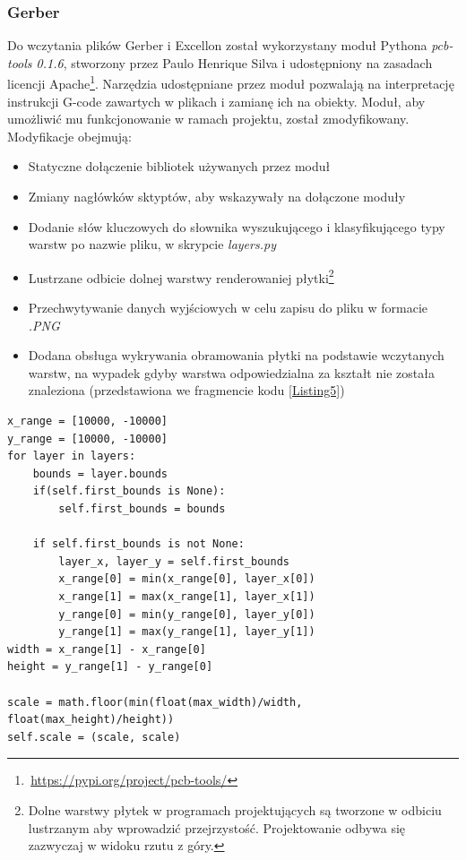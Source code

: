 \documentclass{xmgr}
\begin{document}
\subsubsection{Gerber}
Do wczytania plików Gerber i Excellon został wykorzystany moduł Pythona \emph{pcb-tools 0.1.6}, stworzony przez Paulo Henrique Silva i udostępniony na zasadach licencji Apache\footnote{\,\url{https://pypi.org/project/pcb-tools/}}. Narzędzia udostępniane przez moduł pozwalają na interpretację instrukcji G-code zawartych w plikach i zamianę ich na obiekty. Moduł, aby umożliwić mu funkcjonowanie w ramach projektu, został zmodyfikowany. Modyfikacje obejmują:
\begin{itemize}
\item Statyczne dołączenie bibliotek używanych przez moduł
\item Zmiany nagłówków sktyptów, aby wskazywały na dołączone moduły
\item Dodanie słów kluczowych do słownika wyszukującego i klasyfikującego typy warstw po nazwie pliku, w skrypcie \emph{layers.py}
\item Lustrzane odbicie dolnej warstwy renderowaniej płytki\footnote{Dolne warstwy płytek w programach projektujących są tworzone w odbiciu lustrzanym aby wprowadzić przejrzystość. Projektowanie odbywa się zazwyczaj w widoku rzutu z góry.}
\item Przechwytywanie danych wyjściowych w celu zapisu do pliku w formacie \emph{.PNG}
\item Dodana obsługa wykrywania obramowania płytki na podstawie wczytanych warstw, na wypadek gdyby warstwa odpowiedzialna za kształt nie została znaleziona (przedstawiona we fragmencie kodu \ref{Listing5})
\end{itemize} 

\begin{lstlisting}
x_range = [10000, -10000]
y_range = [10000, -10000]
for layer in layers:
	bounds = layer.bounds
	if(self.first_bounds is None):
		self.first_bounds = bounds

	if self.first_bounds is not None:
		layer_x, layer_y = self.first_bounds
		x_range[0] = min(x_range[0], layer_x[0])
		x_range[1] = max(x_range[1], layer_x[1])
		y_range[0] = min(y_range[0], layer_y[0])
		y_range[1] = max(y_range[1], layer_y[1])
width = x_range[1] - x_range[0]
height = y_range[1] - y_range[0]

scale = math.floor(min(float(max_width)/width, float(max_height)/height))
self.scale = (scale, scale)
\end{lstlisting}
\end{document}
